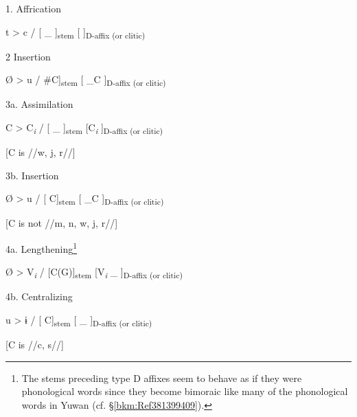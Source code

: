 \ea\label{ex:8-17}
  1.  Affrication

    t  >  c  /  [    \_ ]\textsubscript{stem}  [  ]\textsubscript{D-affix (or clitic)}

  2  Insertion

    Ø  >  u  /  \#C]\textsubscript{stem}  [ \_C  ]\textsubscript{D-affix (or clitic)}

  3a.  Assimilation

    C  >  C\textit{\textsubscript{i}}  /  [    \_ ]\textsubscript{stem}  [C\textit{\textsubscript{i}}  ]\textsubscript{D-affix (or clitic)}

    [C is //w, j, r//]      

  3b.  Insertion

    Ø  >  u  /  [     C]\textsubscript{stem}  [ \_C  ]\textsubscript{D-affix (or clitic)}

        [C is not //m, n, w, j, r//]  

  4a.  Lengthening\footnote{The stems preceding type D affixes seem to behave as if they were phonological words since they become bimoraic like many of the phonological words in Yuwan (cf. §\ref{bkm:Ref381399409}).}

    Ø  >  V\textit{\textsubscript{i}}  /  [C(G)]\textsubscript{stem}  [V\textit{\textsubscript{i}} \_   ]\textsubscript{D-affix (or clitic)}

  4b.  Centralizing

    u  >  ɨ  /  [    C]\textsubscript{stem}  [ \_  ]\textsubscript{D-affix (or clitic)}

            [C is //c, s//]    
\z

